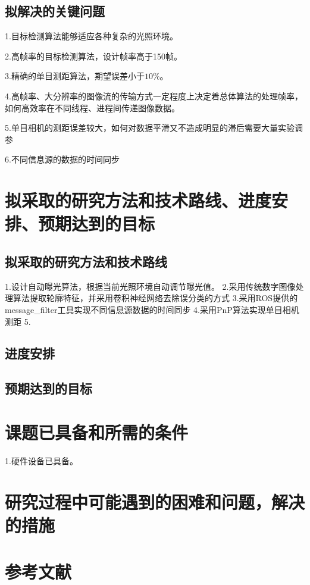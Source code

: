 \subsection{拟解决的关键问题}
1.目标检测算法能够适应各种复杂的光照环境。\par
2.高帧率的目标检测算法，设计帧率高于150帧。 \par
3.精确的单目测距算法，期望误差小于$10\%$。 \par
4.高帧率、大分辨率的图像流的传输方式一定程度上决定着总体算法的处理帧率，如何高效率在不同线程、进程间传递图像数据。 \par
5.单目相机的测距误差较大，如何对数据平滑又不造成明显的滞后需要大量实验调参 \par
6.不同信息源的数据的时间同步
\section{拟采取的研究方法和技术路线、进度安排、预期达到的目标}
\subsection{拟采取的研究方法和技术路线}
1.设计自动曝光算法，根据当前光照环境自动调节曝光值。
2.采用传统数字图像处理算法提取轮廓特征，并采用卷积神经网络去除误分类的方式
3.采用ROS提供的message_filter工具实现不同信息源数据的时间同步
4.采用PnP算法实现单目相机测距
5.
\subsection{进度安排}
\subsection{预期达到的目标}
\section{课题已具备和所需的条件}
1.硬件设备已具备。 
\section{研究过程中可能遇到的困难和问题，解决的措施}

\section{参考文献}



